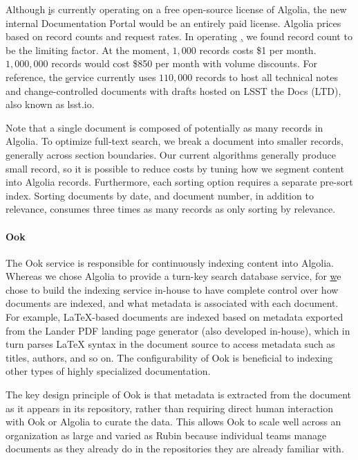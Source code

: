 Although \href{www.lsst.io} is currently operating on a free open-source license of Algolia, the new internal Documentation Portal would be an entirely paid license.
Algolia prices based on record counts and request rates.
In operating \href{www.lsst.io}, we found record count to be the limiting factor.
At the moment, $1,000$ records costs \$1 per month.
$1,000,000$ records would cost \$850 per month with volume discounts.
For reference, the \href{www.lsst.io} service currently uses $110,000$ records to host all technical notes and change-controlled documents with drafts hosted on LSST the Docs (LTD), also known as lsst.io.

Note that a single document is composed of potentially as many records in Algolia.
To optimize full-text search, we break a document into smaller records, generally across section boundaries.
Our current algorithms generally produce small record, so it is possible to reduce costs by tuning how we segment content into Algolia records.
Furthermore, each sorting option requires a separate pre-sort index.
Sorting documents by date, and document number, in addition to relevance, consumes three times as many records as only sorting by relevance.

\paragraph{Ook}

The Ook service is responsible for continuously indexing content into Algolia. \citep{ook-cite}
Whereas we chose Algolia to provide a turn-key search database service, for \href{www.lsst.io} we chose to build the indexing service in-house to have complete control over how documents are indexed, and what metadata is associated with each document.
For example, LaTeX-based documents are indexed based on metadata exported from the Lander PDF landing page generator (also developed in-house), which in turn parses LaTeX syntax in the document source to access metadata such as titles, authors, and so on.
The configurability of Ook is beneficial to indexing other types of highly specialized documentation.

The key design principle of Ook is that metadata is extracted from the document as it appears in its repository, rather than requiring direct human interaction with Ook or Algolia to curate the data.
This allows Ook to scale well across an organization as large and varied as Rubin because individual teams manage documents as they already do in the repositories they are already familiar with.

